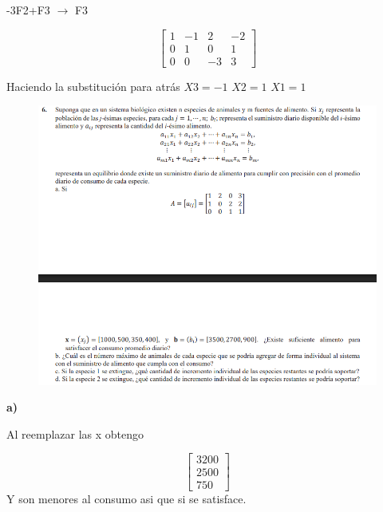 \documentclass[12pt]{article}
\begin{document}
-3F2+F3 $\longrightarrow $ F3

\[
\begin{bmatrix}
1 & -1 & 2 & -2 \\
0 & 1 & 0&1 \\
0 & 0 & -3 & 3
\end{bmatrix}
\]

Haciendo la substitución para atrás 
$X3 = -1$   $X2 =1$  $X1 =1$ 

\begin{figure}[H]
\includegraphics[width=1\textwidth]{./inFiles/Figures/Ej6.png}
\end{figure}


\textbf{a)}

Al reemplazar las x obtengo

\[
\begin{bmatrix}
3200 \\
2500\\
750
\end{bmatrix}
\] 
Y son menores al consumo asi que si se satisface.
\end{document}
